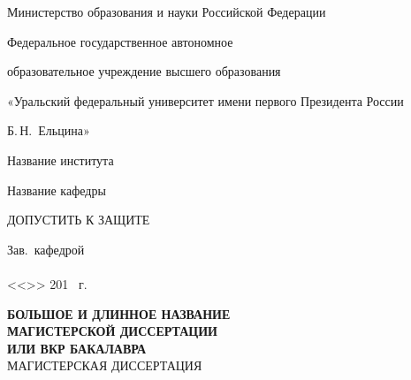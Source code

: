 \newpage
\thispagestyle{empty}

\begin{centering}

{\addtolength{\parskip}{-.35em}
Министерство образования и науки Российской Федерации

Федеральное государственное автономное 

образовательное учреждение высшего образования

«Уральский федеральный университет имени первого Президента России

Б.\,Н.~Ельцина»}

\vspace{.35em} Название института

\vspace{.35em} Название кафедры

\vspace{1.5em}

\begin{flushright}
\begin{minipage}{80mm}
  \begin{flushleft}
  \large{ДОПУСТИТЬ К ЗАЩИТЕ}\vspace{-.5em}
  \end{flushleft}
  Зав.\ кафедрой \hrulefill
  \vspace{.5em} \\
  \vspace{-.25em} \\
  <<\underline{\hspace{15mm}}>> \underline{\hspace{40mm}} 201%
  \underline{\hspace{5mm}}~г. \\
\end{minipage}
\end{flushright}

\vspace{.5em}

{
  \large
  \textbf{БОЛЬШОЕ И ДЛИННОЕ НАЗВАНИЕ} \\
  \textbf{МАГИСТЕРСКОЙ ДИССЕРТАЦИИ} \\
  \textbf{ИЛИ ВКР БАКАЛАВРА} \\
  \vspace{1.5em}
  МАГИСТЕРСКАЯ ДИССЕРТАЦИЯ
  \vspace{1em} \\
}


\end{centering}
